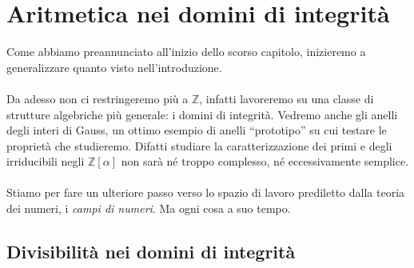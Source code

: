 \chapter{Aritmetica nei domini di integrità}
\label{lezione3}
Come abbiamo preannunciato all'inizio dello scorso capitolo, inizieremo a generalizzare quanto visto nell'introduzione. \\ \\ Da adesso non ci restringeremo più a $\mathbb{Z}$, infatti lavoreremo su una classe di strutture algebriche più generale: i domini di integrità. Vedremo anche gli anelli degli interi di Gauss, un ottimo esempio di anelli \enquote{prototipo} su cui testare le proprietà che studieremo. Difatti studiare la caratterizzazione dei primi e degli irriducibili negli $\mathbb{Z}[\alpha]$ non sarà né troppo complesso, né eccessivamente semplice. \\ \\ Stiamo per fare un ulteriore passo verso lo spazio di lavoro prediletto dalla teoria dei numeri, i \textit{campi di numeri}. Ma ogni cosa a suo tempo.
\section{Divisibilità nei domini di integrità}
